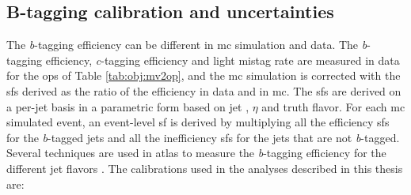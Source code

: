 \subsection{B-tagging calibration and uncertainties}
\label{sec:obj:btaggingcalib}

The \textit{b}-tagging efficiency can be different in \gls{mc} simulation and data. The \textit{b}-tagging efficiency, 
\textit{c}-tagging efficiency and light mistag rate are measured in data for the \glspl{op} of Table \ref{tab:obj:mv2op}, 
and the \gls{mc} simulation is corrected with the \glspl{sf} derived as the ratio of the efficiency in data and in \gls{mc}. 
The \glspl{sf} are derived on a per-jet basis in a parametric form based on jet \pt, $\eta$ and truth flavor. 
For each \gls{mc} simulated event, an event-level \gls{sf} is derived by multiplying all the efficiency \glspl{sf} for the \textit{b}-tagged jets 
and all the inefficiency \glspl{sf} for the jets that are not \textit{b}-tagged. Several techniques are used in \gls{atlas} to measure the \textit{b}-tagging 
efficiency for the different jet flavors \cite{1748-0221-11-04-P04008}.
The calibrations used in the analyses described in this thesis are:

